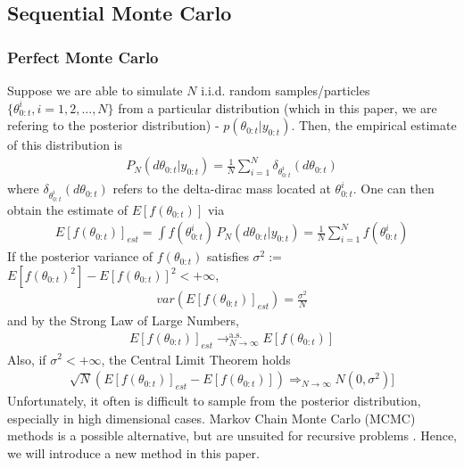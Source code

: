\documentclass[12pt]{article}
\theoremstyle{definition}
\begin{document}
\subsection{Sequential Monte Carlo}
\subsubsection{Perfect Monte Carlo}
Suppose we are able to simulate $N$ i.i.d. random samples/particles $\{\theta_{0:t}^{i},i=1,2,...,N\}$ from a particular distribution (which in this paper, we are refering to the posterior distribution) - $p(\theta_{0:t}|y_{0:t})$. Then, the empirical estimate of this distribution is
\begin{equation}
	\begin{aligned}
		P_{N}(d\theta_{0:t}|y_{0:t}) = \frac{1}{N}\sum_{i=1}^{N}\delta_{\theta_{0:t}^{i}}(d\theta_{0:t})
	\end{aligned}
\end{equation}
where $\delta_{\theta_{0:t}^{i}}(d\theta_{0:t})$ refers to the delta-dirac mass located at $\theta_{0:t}^{i}$. One can then obtain the estimate of $E[f(\theta_{0:t})]$ via
\begin{equation}
	\begin{aligned}
		E[f(\theta_{0:t})]_{est} = \int f(\theta_{0:t}^{i}) \,P_{N}(d\theta_{0:t}|y_{0:t}) = \frac{1}{N}\sum_{i=1}^{N}f(\theta_{0:t}^{i})
	\end{aligned}
\end{equation}
If the posterior variance of $f(\theta_{0:t})$ satisfies \(\sigma^{2} :=\) $E[f(\theta_{0:t})^{2}] - E[f(\theta_{0:t})]^{2} < + \infty $, 
\begin{equation}\label{eq:1}
	\begin{aligned}
		var(E[f(\theta_{0:t})]_{est}) = \frac{\sigma^{2}}{N}
	\end{aligned}
\end{equation}
and by the Strong Law of Large Numbers,
\begin{equation}\label{eq:2}
	\begin{aligned}
		E[f(\theta_{0:t})]_{est} \mathrel{\mathop{\rightarrow}^{\mathrm{a.s.}}_{N \rightarrow \infty}} E[f(\theta_{0:t})]
	\end{aligned}
\end{equation}
Also, if $\sigma^{2} < +\infty$, the Central Limit Theorem holds
\begin{equation}\label{eq:3}
	\begin{aligned}
		\sqrt{N}(E[f(\theta_{0:t})]_{est} - E[f(\theta_{0:t})]) \mathrel{\mathop{\Longrightarrow}_{N \rightarrow \infty}} N(0,\sigma^{2})]
	\end{aligned}
\end{equation}
Unfortunately, it often is difficult to sample from the posterior distribution, especially in high dimensional cases. Markov Chain Monte Carlo (MCMC) methods is a possible alternative, but are unsuited for recursive problems \citep{doucet2001introduction}. Hence, we will introduce a new method in this paper.
\newpage
\end{document}
